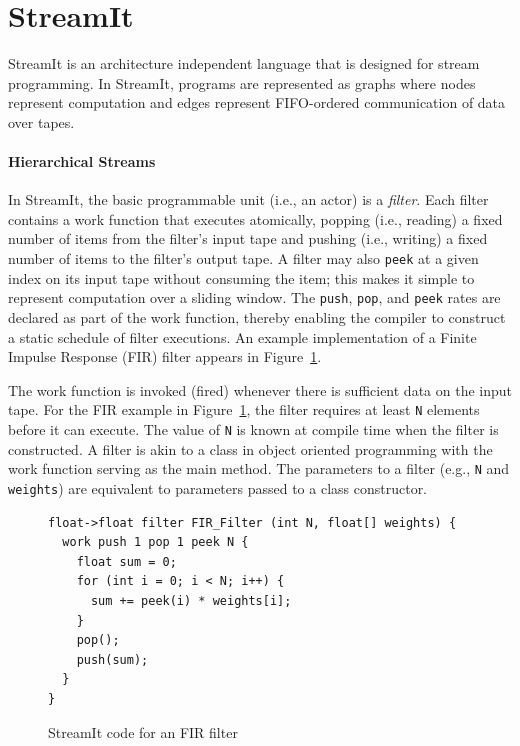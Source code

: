 \section{StreamIt}
\label{sec:streamit}

StreamIt  is   an  architecture independent language that is
designed for  stream programming. In StreamIt, programs are
represented as graphs where  nodes represent  computation and edges
represent FIFO-ordered communication of data over tapes.

\paragraph*{Hierarchical Streams}
In  StreamIt, the  basic programmable  unit (i.e., an actor) is a {\it
filter}.   Each filter contains  a work  function that executes
atomically,  popping (i.e., reading)  a fixed number  of items  from
the  filter's input  tape and pushing (i.e., writing) a fixed number
of items to the filter's output tape.  A filter  may also {\tt peek} at
a given index  on its input tape without  consuming  the  item;  this
makes  it  simple  to  represent computation over a
sliding window.   The {\tt push}, {\tt pop}, and {\tt peek} rates are
declared as part  of  the work  function,  thereby enabling  the
compiler  to construct a static schedule of filter executions. An example
implementation of a Finite Impulse Response (FIR) filter appears in Figure~\ref{fig:fir}.

The work function is invoked (fired) whenever there is sufficient data
on the input tape. For the FIR example in Figure~\ref{fig:fir}, the
filter requires at least \texttt{N} elements before it can
execute. The value of \texttt{N} is known at compile time when the
filter is constructed. A filter is akin to a class in object oriented
programming with the work function serving as the main method. The
parameters to a filter (e.g., \texttt{N} and \texttt{weights}) are
equivalent to parameters passed to a class constructor.

\begin{figure}[t]
\begin{scriptsize}
\begin{verbatim}
float->float filter FIR_Filter (int N, float[] weights) {
  work push 1 pop 1 peek N {
    float sum = 0;
    for (int i = 0; i < N; i++) {
      sum += peek(i) * weights[i];
    }
    pop();
    push(sum);
  }
}
\end{verbatim}
\end{scriptsize}
\vspace{-3pt}
\caption{StreamIt code for an FIR filter\label{fig:fir}}
\end{figure}

